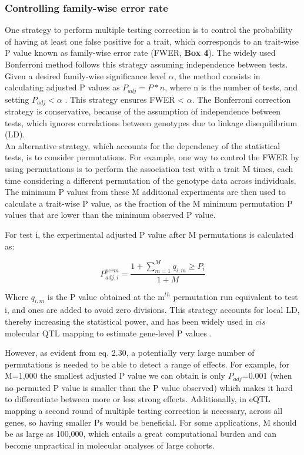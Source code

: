 \subsubsection{Controlling family-wise error rate} 

One strategy to perform multiple testing correction is to control the probability of having at least one false positive for a trait, which corresponds to an trait-wise P value known as family-wise error rate (FWER, \textbf{Box 4}).
The widely used Bonferroni method follows this strategy assuming independence between tests. 
Given a desired family-wise significance level $\alpha$, the method consists in calculating adjusted P values as $P_{adj} = P*n $, where n is the number of tests, and setting $P_{adj} < \alpha$ . 
This strategy ensures FWER < $\alpha$. 
The Bonferroni correction strategy is conservative, because of the assumption of independence between tests, which ignores correlations between genotypes due to linkage disequilibrium (LD).\\

An alternative strategy, which accounts for the dependency of the statistical tests, is to consider permutations. 
For example, one way to control the FWER by using permutations is to perform the association test with a trait M times, each time considering a different permutation of the genotype data across individuals.
The minimum P values from these M additional experiments are then used to calculate a trait-wise P value, as the fraction of the M minimum permutation P values that are lower than the minimum observed P value. 

For test i, the experimental adjusted P value after M permutations is calculated as:

\begin{equation}\label{eq19:permutation_adjusted_pvalue}
    P_{adj,i}^{perm} = \frac{1+\sum_{m=1}^{M} q_{i,m} \geq P_i}{1+M}
\end{equation}

Where $q_{i,m}$ is the P value obtained at the m$^{th}$ permutation run equivalent to test i, and ones are added to avoid zero divisions.  
This strategy accounts for local LD, thereby increasing the statistical power, and has been widely used in $cis$ molecular QTL mapping to estimate gene-level P values \cite{gtex2015genotype}.  

However, as evident from eq. 2.30, a potentially very large number of permutations is needed to be able to detect a range of effects.
For example, for M=1,000 the smallest adjusted P value we can obtain is only $P_{adj}$=0.001 (when no permuted P value is smaller than the P value observed) which makes it hard to differentiate between more or less strong effects.
Additionally, in eQTL mapping a second round of multiple testing correction is necessary, across all genes, so having smaller Ps would be beneficial.
For some applications, M should be as large as 100,000, which entails a great computational burden and can become unpractical in molecular analyses of large cohorts.\\

